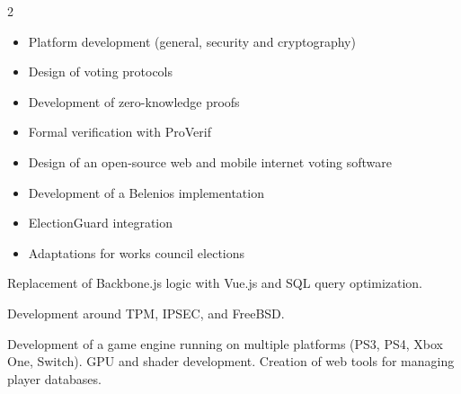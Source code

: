 \documentclass[10pt,a4paper,withhyper]{altacv}
\begin{document}
\begin{paracol}{2}

\begin{itemize}
\item Platform development (general, security and cryptography)
\end{itemize}

\divider

\begin{itemize}
\item Design of voting protocols
\item Development of zero-knowledge proofs
\item Formal verification with ProVerif
\end{itemize}

\divider

\begin{itemize}
\item Design of an open-source web and mobile internet voting software
\item Development of a Belenios implementation
\end{itemize}

\divider

\begin{itemize}
\item ElectionGuard integration
\item Adaptations for works council elections
\end{itemize}

\divider

Replacement of Backbone.js logic with Vue.js and SQL query optimization.

\divider

Development around TPM, IPSEC, and FreeBSD.

\divider

Development of a game engine running on multiple platforms (PS3, PS4, Xbox One, Switch). GPU and shader development. Creation of web tools for managing player databases.


\end{paracol}
\end{document}
